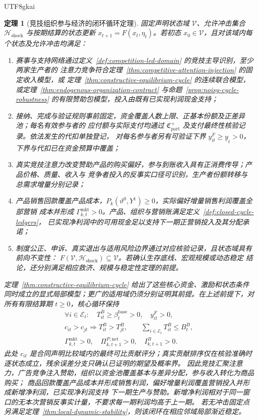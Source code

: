 \documentclass[12pt,a4paper,openany]{report}
\newtheorem{theorem}{定理}[chapter]
\begin{document}
\begin{CJK*}{UTF8}{gkai}
\begin{theorem}[竞技组织参与经济的闭环循环定理]
\label{thm:competition-closed-cycle}
固定声明状态域 \(\mathcal V\)、允许冲击集合 \(\mathcal H_{\mathrm{shock}}\) 与按期结算的状态更新
\(x_{t+1}=F(x_t,\eta_t)\)。若初态 \(x_0\in\mathcal V\)，且对该域内每个状态及允许冲击均满足：
\begin{enumerate}[label=\textnormal{L\arabic*:},leftmargin=3.5em]
  \item 赛事与支持网络通过定义~\ref{def:competition-led-domain} 的竞技主导识别，至少两家生产者的
  注意力竞争符合定理~\ref{thm:competitive-attention-injection} 的固定收入模型，或
  定理~\ref{thm:constructive-equilibrium-cycle} 的连续联合模型，或定理~\ref{thm:endogenous-organization-contract}
  与命题~\ref{prop:noisy-cycle-robustness} 的有限赞助包模型，投入由既有已实现利润现金支持；
  \item 接纳、完成与验证规则事前固定，资金覆盖人数上限、正基本份额及正差异池；每名有效参与者的
  应付额与实际支付均通过 \(\mathfrak C_{\mathrm{part}}^+\) 及支付最终性核验记录。依法发生的代扣单独登记，
  对每名参与者另有可验证下界 \(y_{it}^F\ge\underline y_t>0\)，下界与代扣已在资金预算中覆盖；
  \item 真实竞技注意力改变赞助产品的购买偏好，参与到账收入具有正消费传导；产品价格、质量、收入与
  竞争者投入的反事实口径可识别，生产者份额转移与总需求增量分别记录；
  \item 产品销售回款覆盖产品成本，\(P_k(\vartheta^0,Y^1)\ge0\)，实际偏好增量销售利润覆盖全部营销
  成本并形成 \(\Gamma_{k,t}^{\mathrm{mkt}}>0\)。产品、组织与营销账满足定义~\ref{def:closed-cycle-ledgers}，
  已实现净利润中的可用现金足以支持下一期正营销投入及其分配承诺；
  \item 制度公正、申诉、真实退出与适用风险边界通过对应核验记录，且状态域具有前向不变性：
  \(F(\mathcal V,\mathcal H_{\mathrm{shock}})\subseteq\mathcal V\)。若确认生存底线、宏观规模或动态稳定
  结论，还分别满足相应救济、规模与稳定性定理的前提。
\end{enumerate}
定理~\ref{thm:constructive-equilibrium-cycle} 给出了这些核心资金、激励和状态条件同时成立的显式局部模型；更广的适用域仍须分别证明其前提。在上述前提下，对所有有限结算期 \(t\ge0\)，核心循环保持
\[
\begin{gathered}
  \forall i\in\mathcal E_t:\quad
  T_{it}^B\ge\beta_t^{\mathrm{base}}>0,\quad y_{it}^F>0,\\
  c_{it}>c_{jt}\Longrightarrow T_{it}^B>T_{jt}^B,\qquad
  \sum_{i\in\mathcal E_t}T_{it}^B\le B_t^B,\\
  \Gamma_{k,t}^{\mathrm{mkt}}>0,\quad
  \Pi_{k,t+1}^{P,\mathrm{net}}>0,\quad I_{k,t+1}^B>0.
\end{gathered}
\]
此处 \(c_{it}\) 是合同声明比较域内的最终可比贡献评分；真实贡献排序仅在核验准确时逐状态成立，残余误差分支只确认已证明的期望及概率界。
因此竞技汇聚注意力，广告竞争注入赞助，组织以资金池覆盖基本与差异分配，参与收入转化为商品购买；
商品回款覆盖产品成本并形成销售利润，偏好增量利润覆盖营销投入并形成新增净利润，已实现净利润支持
下一期生产与赞助。新增净利润相对于同一窗口的无本次营销反事实计量，不要求每一期利润均高于上一期。
若无冲击固定点另满足定理~\ref{thm:local-dynamic-stability}，则该闭环在相应邻域局部渐近稳定。
\end{theorem}


\end{CJK*}
\end{document}

